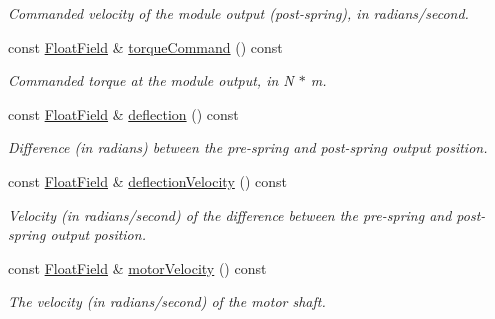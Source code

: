 \begin{DoxyCompactItemize}
\begin{DoxyCompactList}\small\item\em Commanded velocity of the module output (post-\/spring), in radians/second. \end{DoxyCompactList}\item 
\mbox{\label{classhebi_1_1Feedback_1_1Actuator_aa9c6d12fd9f70f6038dc06bd901f00b2}} 
const \hyperlink{classhebi_1_1Feedback_1_1FloatField}{Float\+Field} \& \hyperlink{classhebi_1_1Feedback_1_1Actuator_aa9c6d12fd9f70f6038dc06bd901f00b2}{torque\+Command} () const
\begin{DoxyCompactList}\small\item\em Commanded torque at the module output, in N $\ast$ m. \end{DoxyCompactList}\item 
\mbox{\label{classhebi_1_1Feedback_1_1Actuator_a3713e0a4cf660f2fa8729e2298867c14}} 
const \hyperlink{classhebi_1_1Feedback_1_1FloatField}{Float\+Field} \& \hyperlink{classhebi_1_1Feedback_1_1Actuator_a3713e0a4cf660f2fa8729e2298867c14}{deflection} () const
\begin{DoxyCompactList}\small\item\em Difference (in radians) between the pre-\/spring and post-\/spring output position. \end{DoxyCompactList}\item 
\mbox{\label{classhebi_1_1Feedback_1_1Actuator_a69dcfd58ff4afa1a777dd372adaf632b}} 
const \hyperlink{classhebi_1_1Feedback_1_1FloatField}{Float\+Field} \& \hyperlink{classhebi_1_1Feedback_1_1Actuator_a69dcfd58ff4afa1a777dd372adaf632b}{deflection\+Velocity} () const
\begin{DoxyCompactList}\small\item\em Velocity (in radians/second) of the difference between the pre-\/spring and post-\/spring output position. \end{DoxyCompactList}\item 
\mbox{\label{classhebi_1_1Feedback_1_1Actuator_ad4e745235c1ccc801f06c359843247de}} 
const \hyperlink{classhebi_1_1Feedback_1_1FloatField}{Float\+Field} \& \hyperlink{classhebi_1_1Feedback_1_1Actuator_ad4e745235c1ccc801f06c359843247de}{motor\+Velocity} () const
\begin{DoxyCompactList}\small\item\em The velocity (in radians/second) of the motor shaft. \end{DoxyCompactList}\item 

\end{DoxyCompactItemize}

